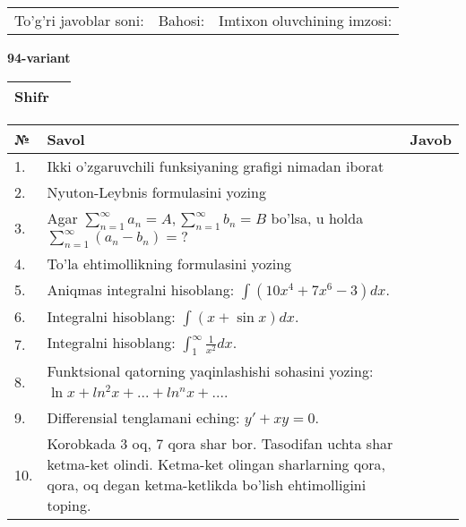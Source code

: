 \documentclass{article}
\begin{document}
  \vspace{1cm}
  
  \begin{tabular}{lll}
  To'g'ri javoblar soni: \underline{\hspace{1.5cm}} & 
  Bahosi: \underline{\hspace{1.5cm}} & 
  Imtixon oluvchining imzosi: \underline{\hspace{2cm}} \\
  \end{tabular}
  
  \egroup
  
  \newpage
  
  
  \textbf{94-variant}\\
  
  \bgroup
  \def\arraystretch{1.6} %
  
  \begin{tabular}{|m{5.7cm}|m{9.5cm}|}
  \hline
  Shifr & \\
  \hline
  \end{tabular}
  
  \vspace{1cm}
  
  \begin{tabular}{|m{0.7cm}|m{10cm}|m{4cm}|}
  \hline
  № & Savol & Javob \\
  \hline
  1. & Ikki o'zgaruvchili funksiyaning grafigi nimadan iborat &  \\
  \hline
  2. & Nyuton-Leybnis formulasini yozing &  \\
  \hline
  3. & Agar \(\sum_{n = 1}^{\infty}a_{n} = A,\sum_{n = 1}^{\infty}b_{n} = B\) bo'lsa, u holda \(\sum_{n = 1}^{\infty}\left( a_{n} - b_{n} \right) = ?\) &  \\
  \hline
  4. & To'la ehtimollikning formulasini yozing &  \\
  \hline
  5. & Aniqmas integralni hisoblang: \(\int {\left( 10x^{4} + 7x^{6} - 3 \right)dx}\). &  \\
  \hline
  6. & Integralni hisoblang: \(\int {(x + \sin x)dx}\). &  \\
  \hline
  7. & Integralni hisoblang: \(\int_{1}^{\infty}{\frac{1}{x^{2}}dx}\). &  \\
  \hline
  8. & Funktsional qatorning yaqinlashishi sohasini yozing: \(\ln x + ln^{2}x + ... + ln^{n}x + ...\). &  \\
  \hline
  9. & Differensial tenglamani eching: \(y' + xy = 0\). &  \\
  \hline
  10. & Korobkada 3 oq, 7 qora shar bor. Tasodifan uchta shar ketma-ket olindi. Ketma-ket olingan sharlarning qora, qora, oq degan ketma-ketlikda bo'lish ehtimolligini toping. &  \\
  \hline
  \end{tabular}
  
\end{document}
